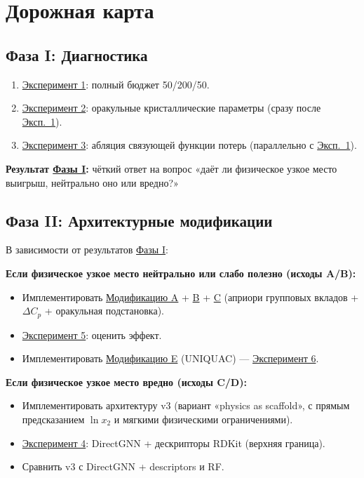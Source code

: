 \documentclass[11pt]{article}
\begin{document}
\section{Дорожная карта}

\subsection{Фаза I: Диагностика}
\label{subsec:roadmap-phase1}

\begin{enumerate}
  \item \hyperref[subsec:exp-full-budget]{Эксперимент 1}: полный бюджет 50/200/50.
  \item \hyperref[subsec:exp-oracle-crystal]{Эксперимент 2}: оракульные кристаллические параметры (сразу после \hyperref[subsec:exp-full-budget]{Эксп.~1}).
  \item \hyperref[subsec:exp-bridge-ablation]{Эксперимент 3}: абляция связующей функции потерь (параллельно с \hyperref[subsec:exp-full-budget]{Эксп.~1}).
\end{enumerate}

\textbf{Результат \hyperref[subsec:roadmap-phase1]{Фазы I}:} чёткий ответ на вопрос «даёт ли физическое узкое место выигрыш, нейтрально оно или вредно?»

\subsection{Фаза II: Архитектурные модификации}
\label{subsec:roadmap-phase2}

В зависимости от результатов \hyperref[subsec:roadmap-phase1]{Фазы I}:

\textbf{Если физическое узкое место нейтрально или слабо полезно (исходы A/B):}
\begin{itemize}
  \item Имплементировать \hyperref[subsec:mod-a]{Модификацию A} + \hyperref[subsec:mod-b]{B} + \hyperref[subsec:mod-c]{C} (априори групповых вкладов + $\Delta C_p$ + оракульная подстановка).
  \item \hyperref[subsec:exp-gc-priors]{Эксперимент 5}: оценить эффект.
  \item Имплементировать \hyperref[subsec:mod-e]{Модификацию E} (UNIQUAC) --- \hyperref[subsec:exp-wilson]{Эксперимент 6}.
\end{itemize}

\textbf{Если физическое узкое место вредно (исходы C/D):}
\begin{itemize}
  \item Имплементировать архитектуру v3 (вариант «physics as scaffold», с прямым предсказанием $\ln x_2$ и мягкими физическими ограничениями).
  \item \hyperref[subsec:exp-directgnn-rdkit]{Эксперимент 4}: DirectGNN + дескрипторы RDKit (верхняя граница).
  \item Сравнить v3 с DirectGNN + descriptors и RF.
\end{itemize}
\end{document}
